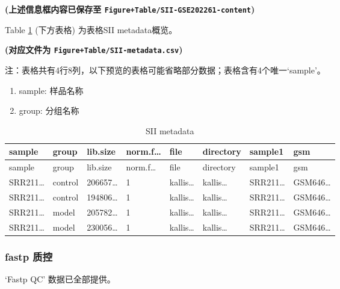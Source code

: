 \documentclass[
]{article}
\providecommand{\tightlist}{%
  \setlength{\itemsep}{0pt}\setlength{\parskip}{0pt}}
\begin{document}
\textbf{(上述信息框内容已保存至 \texttt{Figure+Table/SII-GSE202261-content})}

Table \ref{tab:SII-metadata} (下方表格) 为表格SII metadata概览。

\textbf{(对应文件为 \texttt{Figure+Table/SII-metadata.csv})}

\begin{center}\begin{tcolorbox}[colback=gray!10, colframe=gray!50, width=0.9\linewidth, arc=1mm, boxrule=0.5pt]注：表格共有4行8列，以下预览的表格可能省略部分数据；表格含有4个唯一`sample'。
\end{tcolorbox}
\end{center}
\begin{center}\begin{tcolorbox}[colback=gray!10, colframe=gray!50, width=0.9\linewidth, arc=1mm, boxrule=0.5pt]\begin{enumerate}\tightlist
\item sample:  样品名称
\item group:  分组名称
\end{enumerate}\end{tcolorbox}
\end{center}

\begin{longtable}[]{@{}llllllll@{}}
\caption{\label{tab:SII-metadata}SII metadata}\tabularnewline
\toprule
sample & group & lib.size & norm.f\ldots{} & file & directory & sample1 & gsm\tabularnewline
\midrule
\endfirsthead
\toprule
sample & group & lib.size & norm.f\ldots{} & file & directory & sample1 & gsm\tabularnewline
\midrule
\endhead
SRR211\ldots{} & control & 206657\ldots{} & 1 & kallis\ldots{} & kallis\ldots{} & SRR211\ldots{} & GSM646\ldots{}\tabularnewline
SRR211\ldots{} & control & 194806\ldots{} & 1 & kallis\ldots{} & kallis\ldots{} & SRR211\ldots{} & GSM646\ldots{}\tabularnewline
SRR211\ldots{} & model & 205782\ldots{} & 1 & kallis\ldots{} & kallis\ldots{} & SRR211\ldots{} & GSM646\ldots{}\tabularnewline
SRR211\ldots{} & model & 230056\ldots{} & 1 & kallis\ldots{} & kallis\ldots{} & SRR211\ldots{} & GSM646\ldots{}\tabularnewline
\bottomrule
\end{longtable}

\hypertarget{fastp-ux8d28ux63a7}{%
\subsubsection{fastp 质控}\label{fastp-ux8d28ux63a7}}

`Fastp QC' 数据已全部提供。
\end{document}

